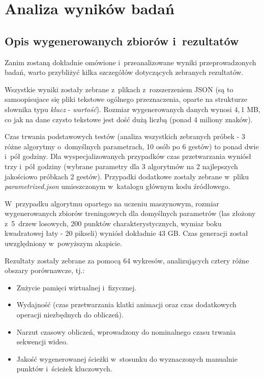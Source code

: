 \chapter{Analiza wyników badań}\label{Chapter_AnalizaRezultatow}

  \section{Opis wygenerowanych zbiorów i~rezultatów}\label{Section_Results}
    Zanim zostaną dokładnie omówione i~przeanalizowane wyniki przeprowadzonych badań, warto przybliżyć kilka szczegółów dotyczących zebranych rezultatów.

    Wszystkie wyniki zostały zebrane z~plikach z~rozszerzeniem JSON (są to samoopisujace się pliki tekstowe ogólnego przeznaczenia, oparte na strukturze słownika typu \textit{klucz} - \textit{wartość}). Rozmiar wygenerowanych danych wynosi $4,1$ MB, co jak na dane czysto tekstowe jest dość dużą liczbą (ponad 4 miliony znaków).

    Czas trwania podstawowych testów (analiza wszystkich zebranych próbek - 3 różne algorytmy o~domyślnych parametrach, 10 osób po 6 gestów) to ponad dwie i~pół godziny. Dla wyspecjalizowanych przypadków czas przetwarzania wyniósł trzy i~pół godziny (wybrane parametry dla 3 algorytmów na 2 najlepszych jakościowo próbkach 2 gestów). Przypadki dodatkowe zostały zebrane w~pliku \textit{parametrized.json} umieszczonym w~katalogu głównym kodu źródłowego.

    W~przypadku algorytmu opartego na uczeniu maszynowym, rozmiar wygenerowanych zbiorów treningowych dla domyślnych parametrów (las złożony z~5~drzew losowych, 200 punktów charakterystycznych, wymiar boku kwadratowej łaty - 20 pikseli) wyniósł dokładnie $43$ GB. Czas generacji został uwzględniony w~powyższym akapicie.

    Rezultaty zostały zebrane za pomocą 64 wykresów, analizujących cztery różne obszary porównawcze, tj.:
    \begin{itemize}
      \item Zużycie pamięci wirtualnej i~fizycznej.
      \item Wydajność (czas przetwarzania klatki animacji oraz czas dodatkowych operacji niezbędnych do obliczeń).
      \item Narzut czasowy obliczeń, wprowadzony do nominalnego czasu trwania sekwencji wideo.
      \item Jakość wygenerowanej ścieżki w~stosunku do wyznaczonych manualnie punktów i~ścieżek kluczowych.
    \end{itemize}


